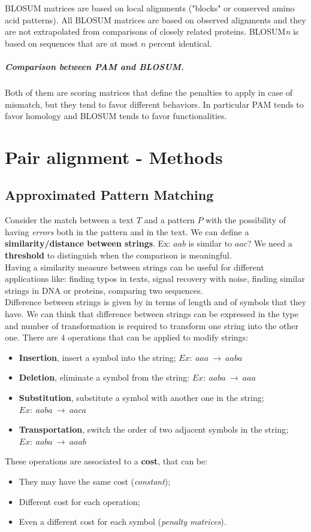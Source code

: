 BLOSUM matrices are based on local alignments ("blocks" or conserved amino acid patterns). All BLOSUM matrices are based on observed alignments and they are not extrapolated from comparisons of closely related proteins. BLOSUM\textit{n} is based on sequences that are at most $n$ percent identical.

\paragraph{Comparison between PAM and BLOSUM.} Both of them are scoring matrices that define the penalties to apply in case of mismatch, but they tend to favor different behaviors. In particular PAM tends to favor homology and BLOSUM tends to favor functionalities.

\chapter{Pair alignment - Methods}
\section{Approximated Pattern Matching}
Consider the match between a text $T$ and a pattern $P$ with the possibility of having \textit{errors} both in the pattern and in the text. We can define a \textbf{similarity/distance between strings}. Ex: $aab$ is similar to $aac$? We need a \textbf{threshold} to distinguish when the comparison is meaningful.\\
Having a similarity measure between strings can be useful for different applications like: finding typos in texts, signal recovery with noise, finding similar strings in DNA or proteins, comparing two sequences. \\

Difference between strings is given by in terms of length and of symbols that they have. We can think that difference between strings can be expressed in the type and number of transformation is required to transform one string into the other one. There are $4$ operations that can be applied to modify strings:
\begin{itemize}
	\item \textbf{Insertion}, insert a symbol into the string; $Ex:~ aaa~\rightarrow~aaba$
	\item \textbf{Deletion}, eliminate a symbol from the string: $Ex:~ aaba~\rightarrow~aaa$
	\item \textbf{Substitution}, substitute a symbol with another one in the string; $Ex:~ aaba~\rightarrow~aaca$
	\item \textbf{Transportation}, switch the order of two adjacent symbols in the string; $Ex:~ aaba~\rightarrow~aaab$
\end{itemize}
These operations are associated to a \textbf{cost}, that can be:
\begin{itemize}
	\item They may have the same cost (\textit{constant});
	\item Different cost for each operation;
	\item Even a different cost for each symbol (\textit{penalty matrices}).
\end{itemize}

